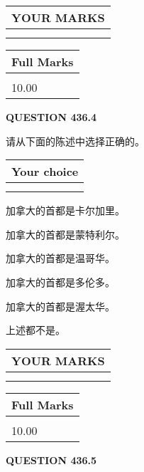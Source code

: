 \documentclass{ctexart}
\begin{document}
 
  
\vspace{0.2in}
  
\noindent\begin{tabular}{|l|}
\hline
 YOUR MARKS  \\
\hline
 \\ 
 \\ 
\hline
\end{tabular}
\hspace{0.05in} \begin{tabular}{|l|}
\hline
 Full Marks  \\
\hline
 \\ 
10.00 \\
\hline
\end{tabular}
{\textbf{\Large{QUESTION
436.4 
}}}
  
  
请从下面的陈述中选择正确的。
  
  
\noindent\hspace{3.0in} \begin{tabular}{|l|}
\hline
Your choice \\
\hline
 \\ 
 \\ 
\hline
\end{tabular}
  
  
 
 
加拿大的首都是卡尔加里。
 
 
加拿大的首都是蒙特利尔。
 
 
加拿大的首都是温哥华。
 
 
加拿大的首都是多伦多。
 
 
加拿大的首都是渥太华。
 
 
 上述都不是。
 
 
  
\vspace{0.2in}
  
\noindent\begin{tabular}{|l|}
\hline
 YOUR MARKS  \\
\hline
 \\ 
 \\ 
\hline
\end{tabular}
\hspace{0.05in} \begin{tabular}{|l|}
\hline
 Full Marks  \\
\hline
 \\ 
10.00 \\
\hline
\end{tabular}
{\textbf{\Large{QUESTION
436.5 
}}}
  
\end{document}
